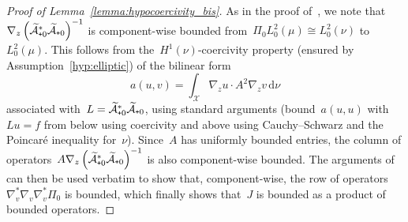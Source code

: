\documentclass[10pt]{article}
\renewcommand{\d}{\mathrm{d}}
\newcommand{\cX}{\mathcal{X}}
\newcommand{\cA}{\mathcal{A}}
\newcommand{\wLmuz}{L^2_0(\mu)}
\newcommand{\subplus}{\textnormal{\texttt{+}}}
\newcommand{\1}{\mathbbm 1}
\begin{document}
\begin{proof}[Proof of Lemma~\ref{lemma:hypocoercivity_bis}]
    As in the proof of~\cite[Theorem 3.3]{BFLS22}, we note that~$\nabla_z\left({\widetilde{\mathcal A}}^*_{\subplus 0}{\widetilde{\mathcal A}}_{\subplus 0}\right)^{-1}$ is component-wise bounded from~$\Pi_0\wLmuz \cong L_0^2(\nu)$ to~$\wLmuz$. This follows from the~$H^1(\nu)$-coercivity property (ensured by Assumption~\ref{hyp:elliptic}) of the bilinear form
    $$a(u,v)=\int_{\cX}\nabla_z u\cdot A^2 \nabla_z v\,\d\nu$$
    associated with~$L=\widetilde{\cA}^*_{\subplus 0}\widetilde{\cA}_{\subplus 0}$, using standard arguments (bound~$a(u,u)$ with~$Lu=f$ from below using coercivity and above using Cauchy--Schwarz and the Poincar\'e inequality for~$\nu$).
    Since~$A$ has uniformly bounded entries, the column of operators~$A\nabla_z\left({\widetilde{\mathcal A}}^*_{\subplus 0}{\widetilde{\mathcal A}}_{\subplus 0}\right)^{-1} $ is also component-wise bounded. The arguments of~\cite[Theorem 3.3]{BFLS22} can then be used verbatim to show that, component-wise, the row of operators~$\nabla_v^*\nabla_v\nabla_v^*\Pi_0$ is bounded, which finally shows that~$J$ is bounded as a product of bounded operators.


\end{proof}
\end{document}
